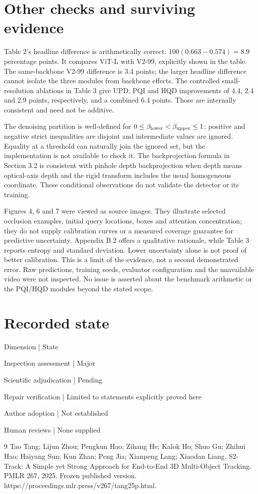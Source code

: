 \documentclass[10pt]{article}
\begin{document}
\section*{Other checks and surviving evidence}
Table 2’s headline difference is arithmetically correct: \(100(0.663-0.574)=8.9\) percentage points. It compares ViT-L with V2-99, explicitly shown in the table. The same-backbone V2-99 difference is 3.4 points; the larger headline difference cannot isolate the three modules from backbone effects. The controlled small-resolution ablations in Table 3 give UPD, PQI and HQD improvements of 4.4, 2.4 and 2.9 points, respectively, and a combined 6.4 points. Those are internally consistent and need not be additive.\par
The denoising partition is well-defined for \(0\leq\beta_{\rm lower}<\beta_{\rm upper}\leq1\): positive and negative strict inequalities are disjoint and intermediate values are ignored. Equality at a threshold can naturally join the ignored set, but the implementation is not available to check it. The backprojection formula in Section 3.2 is consistent with pinhole depth backprojection when depth means optical-axis depth and the rigid transform includes the usual homogeneous coordinate. These conditional observations do not validate the detector or its training.\par
Figures 4, 6 and 7 were viewed as source images. They illustrate selected occlusion examples, initial query locations, boxes and attention concentration; they do not supply calibration curves or a measured coverage guarantee for predictive uncertainty. Appendix B.2 offers a qualitative rationale, while Table 3 reports entropy and standard deviation. Lower uncertainty alone is not proof of better calibration. This is a limit of the evidence, not a second demonstrated error. Raw predictions, training seeds, evaluator configuration and the unavailable video were not inspected. No issue is asserted about the benchmark arithmetic or the PQI/HQD modules beyond the stated scope.\par
\section*{Recorded state}
Dimension | State\par
Inspection assessment | Major\par
Scientific adjudication | Pending\par
Repair verification | Limited to statements explicitly proved here\par
Author adoption | Not established\par
Human reviews | None supplied\par
9 Tao Tang; Lijun Zhou; Pengkun Hao; Zihang He; Kalok Ho; Shuo Gu; Zhihui Hao; Haiyang Sun; Kun Zhan; Peng Jia; Xianpeng Lang; Xiaodan Liang. S2-Track: A Simple yet Strong Approach for End-to-End 3D Multi-Object Tracking. PMLR 267, 2025. Frozen published version. https://proceedings.mlr.press/v267/tang25p.html.\par
\end{document}
